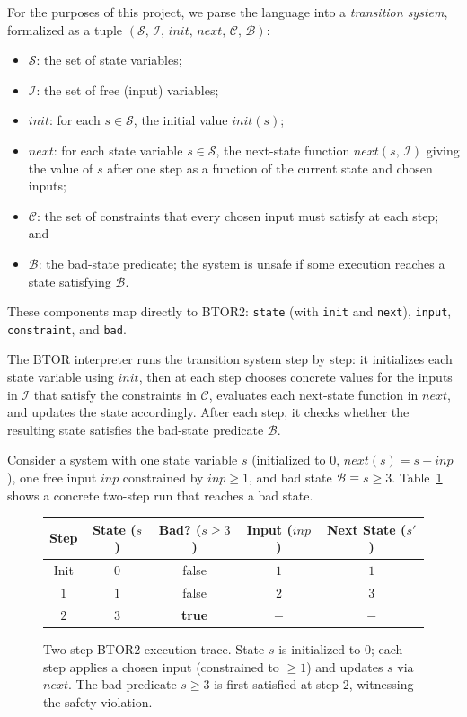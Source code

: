 \documentclass[11pt]{article}
\begin{document}
For the purposes of this project, we parse the language into a \emph{transition system}, formalized as a tuple $(\mathcal{S},\,\mathcal{I},\,\mathit{init},\,\mathit{next},\,\mathcal{C},\,\mathcal{B})$:
\begin{itemize}
    \item $\mathcal{S}$: the set of state variables;
    \item $\mathcal{I}$: the set of free (input) variables;
    \item $\mathit{init}$: for each $s \in \mathcal{S}$, the initial value $\mathit{init}(s)$;
    \item $\mathit{next}$: for each state variable $s \in \mathcal{S}$, the next-state function $\mathit{next}(s,\,\mathcal{I})$ giving the value of $s$ after one step as a function of the current state and chosen inputs;
    \item $\mathcal{C}$: the set of constraints that every chosen input must satisfy at each step; and
    \item $\mathcal{B}$: the bad-state predicate; the system is unsafe if some execution reaches a state satisfying $\mathcal{B}$.
\end{itemize}
These components map directly to BTOR2: \texttt{state} (with \texttt{init} and \texttt{next}), \texttt{input}, \texttt{constraint}, and \texttt{bad}.

The BTOR interpreter runs the transition system step by step: it initializes each state variable using $\mathit{init}$, then at each step chooses concrete values for the inputs in $\mathcal{I}$ that satisfy the constraints in $\mathcal{C}$, evaluates each next-state function in $\mathit{next}$, and updates the state accordingly. After each step, it checks whether the resulting state satisfies the bad-state predicate $\mathcal{B}$.

Consider a system with one state variable $s$ (initialized to $0$, $\mathit{next}(s) = s + \mathit{inp}$), one free input $\mathit{inp}$ constrained by $\mathit{inp} \geq 1$, and bad state $\mathcal{B} \equiv s \geq 3$. Table~\ref{fig:btor2-trace} shows a concrete two-step run that reaches a bad state.

\begin{figure}[H]
    \centering
    \begin{tabular}{|c|c|c|c|c|}
        \hline
        \textbf{Step} & \textbf{State ($s$)} & \textbf{Bad? ($s \geq 3$)} & \textbf{Input ($\mathit{inp}$)} & \textbf{Next State ($s'$)} \\
        \hline
        Init & $0$ & false & $1$ & $1$ \\
        \hline
        $1$  & $1$ & false & $2$ & $3$ \\
        \hline
        $2$  & $3$ & \textbf{true} & $-$ & $-$ \\
        \hline
    \end{tabular}
    \caption{Two-step BTOR2 execution trace. State $s$ is initialized to $0$; each step applies a chosen input (constrained to $\geq 1$) and updates $s$ via $\mathit{next}$. The bad predicate $s \geq 3$ is first satisfied at step $2$, witnessing the safety violation.}
    \label{fig:btor2-trace}
\end{figure}
\end{document}

